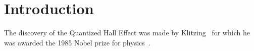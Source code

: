 


\section{Introduction}
The discovery of the Quantized Hall Effect was made by
Klitzing~\cite{reichl} for which he was awarded the 1985 Nobel
prize for physics~\cite{parker}.



